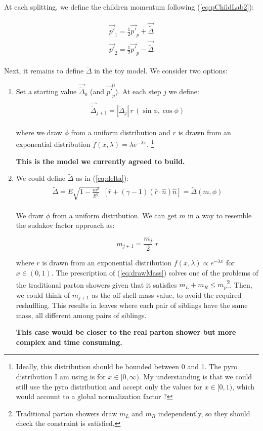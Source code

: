 \documentclass[12pt]{article}
\def\beq{\begin{equation}}
\def\eeq{\end{equation}}
\def\beq{\begin{equation}}
\def\eeq{\end{equation}}
\newcommand{\bea}{\begin{eqnarray}\begin{aligned}}
\newcommand{\eea}{\end{aligned}\end{eqnarray}}
\begin{document}
At each splitting, we define the children momentum following (\ref{eq:pChildLab2}):

\bea\label{eq:pChildLab2}
\vec{p'}_1= \frac{1}{2} \vec{p'}_p + \vec{\tilde{\Delta}}  \\
\vec{p'}_2= \frac{1}{2} \vec{p'}_p - \vec{\tilde{\Delta}}
\eea






Next,  it remains to define $\tilde{\Delta}$ in the toy model. We consider two options:

\begin{enumerate}
\item Set a starting value $\vec{\tilde{\Delta}}_0$ (and $\vec{p'}_{p}^0$). At each step $j$ we define:
\bea
\vec{\tilde{\Delta}}_{j+1} = |\tilde{\Delta}_j|  \,r \, (\sin{\phi},\cos{\phi})
\eea

where we draw $\phi$ from a uniform distribution and $r$ is drawn from an exponential distribution $f(x,\lambda)=\lambda e^{-\lambda x}$. \footnote{Ideally, this distribution should be bounded between 0 and 1. The pyro distribution I am using is for $x \in [0,\infty)$. My understanding is that we could still use the pyro distribution and accept only the values for $x \in [0,1)$, which would account to a global normalization factor ?  }

 {\bf This is the model we currently agreed to build.}

\item We could define $\tilde{\Delta}$  as in (\ref{eq:delta}):
\bea
 \tilde{\Delta}   = E \sqrt{1-\frac{m^2}{E^2}} \,\,\,[ \hat{r} + (\gamma -1) (\hat{r} \cdot \hat{n}) \hat{n} ] = \tilde{\Delta}(m,\phi)
\eea

We draw $\phi$ from a uniform distribution. We can get $m$ in a way to resemble the sudakov factor approach as:

\beq\label{eq:drawMass}
m_{j+1} = \frac{m_j}{2}\,\,  r 
\eeq

where $r$ is drawn from an exponential distribution $f(x,\lambda) \propto e^{-\lambda x}$ for $x \in (0,1)$. The prescription of (\ref{eq:drawMass}) solves one of the problems of the traditional parton showers given that it satisfies $m_L + m_R \leq m_p$\footnote{Traditional parton showers draw $m_L$ and $m_R$ independently, so they should check the constraint is satisfied.}. Then, we could think of $m_{j+1}$ as the off-shell mass value, to avoid the required reshuffling. This results in leaves where each pair of siblings have the same mass, all different among pairs of siblings.


{\bf This case would be closer to the real parton shower but more complex and time consuming.}

\end{enumerate}
\end{document}
